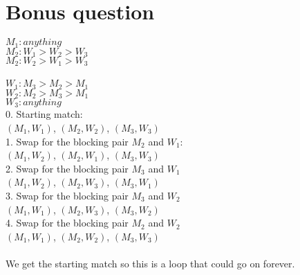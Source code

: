 \documentclass[a4paper]{article}
\begin{document}
\section{Bonus question}

$M_1: anything $ \\
$M_2: W_1 > W_2 > W_3$\\
$M_2: W_2 > W_1 > W_3$\\\\
$W_1: M_3 > M_2 > M_1$\\
$W_2: M_2 > M_3 > M_1$\\
$W_3: anything$\\

0. Starting match: \\
$(M_1, W_1)$, $(M_2, W_2)$, $(M_3, W_3)$ \\
1. Swap for the blocking pair $M_2$ and $W_1$: \\
$(M_1, W_2)$, $(M_2, W_1)$, $(M_3, W_3)$ \\
2. Swap for the blocking pair $M_3$ and $W_1$ \\
$(M_1, W_2)$, $(M_2, W_3)$, $(M_3, W_1)$ \\
3. Swap for the blocking pair $M_3$ and $W_2$ \\
$(M_1, W_1)$, $(M_2, W_3)$, $(M_3, W_2)$ \\
4. Swap for the blocking pair $M_2$ and $W_2$ \\
$(M_1, W_1)$, $(M_2, W_2)$, $(M_3, W_3)$ \\
\\
We get the starting match so this is a loop that could go on forever.
\end{document}
